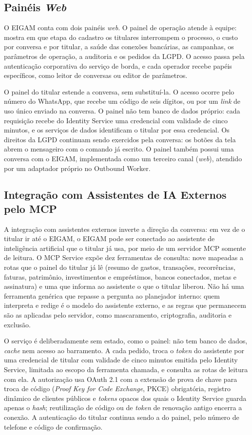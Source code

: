 \subsection{Painéis \textit{Web}}

O EIGAM conta com dois painéis \textit{web}. O painel de operação atende à equipe: mostra em que etapa do cadastro os titulares interrompem o processo, o custo por conversa e por titular, a saúde das conexões bancárias, as campanhas, os parâmetros de operação, a auditoria e os pedidos da LGPD. O acesso passa pela autenticação corporativa do serviço de borda, e cada operador recebe papéis específicos, como leitor de conversas ou editor de parâmetros.

O painel do titular estende a conversa, sem substituí-la. O acesso ocorre pelo número do WhatsApp, que recebe um código de seis dígitos, ou por um \textit{link} de uso único enviado na conversa. O painel não tem banco de dados próprio: cada requisição recebe do Identity Service uma credencial com validade de cinco minutos, e os serviços de dados identificam o titular por essa credencial. Os direitos da LGPD continuam sendo exercidos pela conversa: os botões da tela abrem o mensageiro com o comando já escrito. O painel também possui uma conversa com o EIGAM, implementada como um terceiro canal (\textit{web}), atendido por um adaptador próprio no Outbound Worker.

\subsection{Integração com Assistentes de IA Externos pelo MCP}

A integração com assistentes externos inverte a direção da conversa: em vez de o titular ir até o EIGAM, o EIGAM pode ser conectado ao assistente de inteligência artificial que o titular já usa, por meio de um servidor MCP somente de leitura. O MCP Service expõe dez ferramentas de consulta: nove mapeadas a rotas que o painel do titular já lê (resumo de gastos, transações, recorrências, faturas, patrimônio, investimentos e empréstimos, bancos conectados, metas e assinatura) e uma que informa ao assistente o que o titular liberou. Não há uma ferramenta genérica que repasse a pergunta ao planejador interno: quem interpreta e redige é o modelo do assistente externo, e as regras que permanecem são as aplicadas pelo servidor, como mascaramento, criptografia, auditoria e exclusão.

O serviço é deliberadamente sem estado, como o painel: não tem banco de dados, \textit{cache} nem acesso ao barramento. A cada pedido, troca o \textit{token} do assistente por uma credencial de titular com validade de cinco minutos emitida pelo Identity Service, limitada ao escopo da ferramenta chamada, e consulta as rotas de leitura com ela. A autorização usa OAuth 2.1 com a extensão de prova de chave para troca de código (\textit{Proof Key for Code Exchange}, PKCE) obrigatória, registro dinâmico de clientes públicos e \textit{tokens} opacos dos quais o Identity Service guarda apenas o \textit{hash}; reutilização de código ou de \textit{token} de renovação antigo encerra a conexão. A autenticação do titular continua sendo a do painel, pelo número de telefone e código de confirmação.

